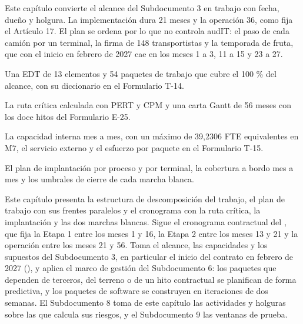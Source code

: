 %

\begin{resumenApertura}
Este capítulo convierte el alcance del Subdocumento 3 en trabajo con fecha, dueño y holgura. La
implementación dura 21 meses y la operación 36, como fija el Artículo 17. El plan se ordena por lo que
no controla audIT: el paso de cada camión por un terminal, la firma de 148 transportistas y la
temporada de fruta, que con el inicio en febrero de 2027 cae en los meses 1 a 3, 11 a 15 y 23 a 27.
\begin{recibe}
  \item Una EDT de 13 elementos y 54 paquetes de trabajo que cubre el 100 \% del alcance, con su diccionario en el Formulario T-14.
  \item La ruta crítica calculada con PERT y CPM y una carta Gantt de 56 meses con los doce hitos del Formulario E-25.
  \item La capacidad interna mes a mes, con un máximo de 39,2306 FTE equivalentes en M7, el servicio externo y el esfuerzo por paquete en el Formulario T-15.
  \item El plan de implantación por proceso y por terminal, la cobertura a bordo mes a mes y los umbrales de cierre de cada marcha blanca.
\end{recibe}
\end{resumenApertura}

Este capítulo presenta la estructura de descomposición del trabajo, el plan de trabajo con sus
frentes paralelos y el cronograma con la ruta crítica, la implantación y las dos marchas blancas.
Sigue el cronograma contractual del , que fija la Etapa 1 entre los meses 1 y 16, la
Etapa 2 entre los meses 13 y 21 y la operación entre los meses 21 y 56. Toma el alcance, las
capacidades y los supuestos del Subdocumento 3, en particular el inicio del contrato en febrero de 2027
(), y aplica el marco de gestión del Subdocumento 6: los paquetes que
dependen de terceros, del terreno o de un hito contractual se planifican de forma predictiva, y los
paquetes de software se construyen en iteraciones de dos semanas. El Subdocumento 8 toma de este
capítulo las actividades y holguras sobre las que calcula sus riesgos, y el Subdocumento 9 las ventanas
de prueba.

